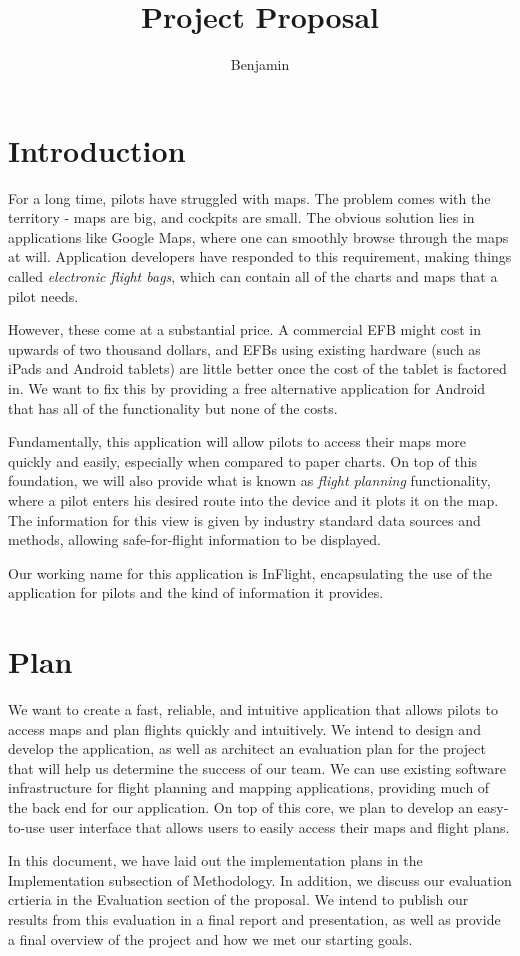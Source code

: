\documentclass[10pt,a4paper]{report}
\author{Benjamin}
\title{Project Proposal}
\begin{document}
\section{Introduction}
For a long time, pilots have struggled with maps. The problem comes with the territory - maps are big, and cockpits are small. The obvious solution lies in applications like Google Maps, where one can smoothly browse through the maps at will. Application developers have responded to this requirement, making things called \emph{electronic flight bags}, which can contain all of the charts and maps that a pilot needs. 

However, these come at a substantial price. A commercial EFB might cost in upwards of two thousand dollars, and EFBs using existing hardware (such as iPads and Android tablets) are little better once the cost of the tablet is factored in. We want to fix this by providing a free alternative application for Android that has all of the functionality but none of the costs.

Fundamentally, this application will allow pilots to access their maps more quickly and easily, especially when compared to paper charts. On top of this foundation, we will also provide what is known as \emph{flight planning} functionality, where a pilot enters his desired route into the device and it plots it on the map. The information for this view is given by industry standard data sources and methods, allowing safe-for-flight information to be displayed.

Our working name for this application is InFlight, encapsulating the use of the application for pilots and the kind of information it provides.
\section{Plan}
We want to create a fast, reliable, and intuitive application that allows pilots to access maps and plan flights quickly and intuitively. We intend to design and develop the application, as well as architect an evaluation plan for the project that will help us determine the success of our team. We can use existing software infrastructure for flight planning and mapping applications, providing much of the back end for our application. On top of this core, we plan to develop an easy-to-use user interface that allows users to easily access their maps and flight plans. 

In this document, we have laid out the implementation plans in the Implementation subsection of Methodology. In addition, we discuss our evaluation crtieria in the Evaluation section of the proposal. We intend to publish our results from this evaluation in a final report and presentation, as well as provide a final overview of the project and how we met our starting goals.
\end{document}
